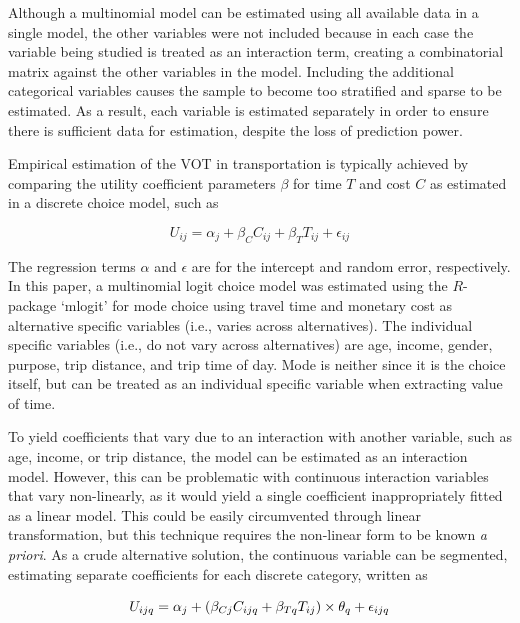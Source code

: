 \documentclass[numbered]{trbunofficial}\usepackage[]{graphicx}\usepackage[]{color}
\begin{document}
Although a multinomial model can be estimated using all available data in a single model, the other variables were not included because in each case the variable being studied is treated as an interaction term, creating a combinatorial matrix against the other variables in the model. Including the additional categorical variables causes the sample to become too stratified and sparse to be estimated. As a result, each variable is estimated separately in order to ensure there is sufficient data for estimation, despite the loss of prediction power.

Empirical estimation of the VOT in transportation is typically achieved by comparing the utility coefficient parameters $\beta$ for time $T$ and cost $C$ as estimated in a discrete choice model, such as

\begin{equation}
U_{ij} = \alpha_{j} + \beta_{C} C_{ij} + \beta_{T} T_{ij} + \epsilon_{ij}
\end{equation}

\noindent The regression terms $\alpha$ and $\epsilon$ are for the intercept and random error, respectively. In this paper, a multinomial logit choice model was estimated using the $R$-package `mlogit' \citep{Croissant2019} for mode choice using travel time and monetary cost as alternative specific variables (i.e., varies across alternatives). The individual specific variables (i.e., do not vary across alternatives) are age, income, gender, purpose, trip distance, and trip time of day. Mode is neither since it is the choice itself, but can be treated as an individual specific variable when extracting value of time.

To yield coefficients that vary due to an interaction with another variable, such as age, income, or trip distance, the model can be estimated as an interaction model. However, this can be problematic with continuous interaction variables that vary non-linearly, as it would yield a single coefficient inappropriately fitted as a linear model. This could be easily circumvented through linear transformation, but this technique requires the non-linear form to be known {\itshape a priori}. As a crude alternative solution, the continuous variable can be segmented, estimating separate coefficients for each discrete category, written as

\begin{equation}
  \label{eq:oneinteract}
  \small
  U_{ijq} = \alpha_{j} + \left( \beta_{Cj} C_{ijq} + \beta_{Tq} T_{ij} \right) \times \theta_{q} + \epsilon_{ijq}
\end{equation}
\end{document}
